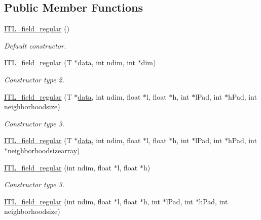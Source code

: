 \subsection*{Public Member Functions}
\begin{DoxyCompactItemize}
\item 
\hyperlink{classITL__field__regular_aca410e01f42b3cfd6c0d6e326e1a1136}{ITL\_\-field\_\-regular} ()
\begin{DoxyCompactList}\small\item\em Default constructor. \item\end{DoxyCompactList}\item 
\hyperlink{classITL__field__regular_abd45e2ed6be99bf2b5a058e39a47b18d}{ITL\_\-field\_\-regular} (T $\ast$\hyperlink{MainIT__regvector_8cpp_a783b2b1c03f80ec0d3ed965238d6bd65}{data}, int ndim, int $\ast$dim)
\begin{DoxyCompactList}\small\item\em Constructor type 2. \item\end{DoxyCompactList}\item 
\hyperlink{classITL__field__regular_ab01f00953429120f8e31152c69852163}{ITL\_\-field\_\-regular} (T $\ast$\hyperlink{MainIT__regvector_8cpp_a783b2b1c03f80ec0d3ed965238d6bd65}{data}, int ndim, float $\ast$l, float $\ast$h, int $\ast$lPad, int $\ast$hPad, int neighborhoodsize)
\begin{DoxyCompactList}\small\item\em Constructor type 3. \item\end{DoxyCompactList}\item 
\hyperlink{classITL__field__regular_aab02e2d45e98a9e8f861c448c30a319c}{ITL\_\-field\_\-regular} (T $\ast$\hyperlink{MainIT__regvector_8cpp_a783b2b1c03f80ec0d3ed965238d6bd65}{data}, int ndim, float $\ast$l, float $\ast$h, int $\ast$lPad, int $\ast$hPad, int $\ast$neighborhoodsizearray)
\item 
\hyperlink{classITL__field__regular_a4fb5a86290af1021054c96b1aed9d504}{ITL\_\-field\_\-regular} (int ndim, float $\ast$l, float $\ast$h)
\begin{DoxyCompactList}\small\item\em Constructor type 3. \item\end{DoxyCompactList}\item 
\hyperlink{classITL__field__regular_a0f0e50f05a38f12596faf9a6fc6a8674}{ITL\_\-field\_\-regular} (int ndim, float $\ast$l, float $\ast$h, int $\ast$lPad, int $\ast$hPad, int neighborhoodsize)

\end{DoxyCompactItemize}
